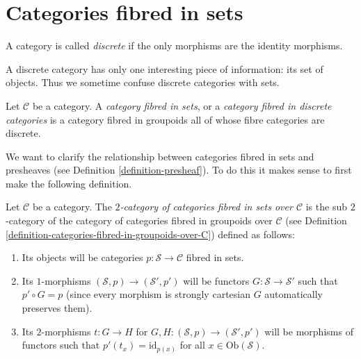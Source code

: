 \section{Categories fibred in sets}
\label{section-fibred-in-sets}

\begin{definition}
\label{definition-discrete}
A category is called {\it discrete} if the only morphisms are the identity
morphisms.
\end{definition}

\noindent
A discrete category has only one interesting piece of information:
its set of objects. Thus we sometime confuse discrete categories
with sets.

\begin{definition}
\label{definition-category-fibred-sets}
Let $\mathcal{C}$ be a category.
A {\it category fibred in sets}, or a {\it category fibred
in discrete categories} is a category fibred in groupoids all
of whose fibre categories are discrete.
\end{definition}

\noindent
We want to clarify the relationship between categories fibred in sets
and presheaves (see Definition \ref{definition-presheaf}).
To do this it makes sense to first make the following definition.

\begin{definition}
\label{definition-categories-fibred-in-sets-over-C}
Let $\mathcal{C}$ be a category.
The {\it $2$-category of categories fibred in sets over $\mathcal{C}$}
is the sub $2$-category of the category of categories fibred in groupoids
over $\mathcal{C}$ (see
Definition \ref{definition-categories-fibred-in-groupoids-over-C})
defined as follows:
\begin{enumerate}
\item Its objects will be categories
$p : \mathcal{S} \to \mathcal{C}$ fibred in sets.
\item Its $1$-morphisms $(\mathcal{S}, p) \to (\mathcal{S}', p')$
will be functors $G : \mathcal{S} \to \mathcal{S}'$ such that
$p' \circ G = p$ (since every morphism is strongly cartesian
$G$ automatically preserves them).
\item Its $2$-morphisms $t : G \to H$ for
$G, H : (\mathcal{S}, p) \to (\mathcal{S}', p')$
will be morphisms of functors
such that $p'(t_x) = \text{id}_{p(x)}$
for all $x \in \text{Ob}(\mathcal{S})$.
\end{enumerate}
\end{definition}

